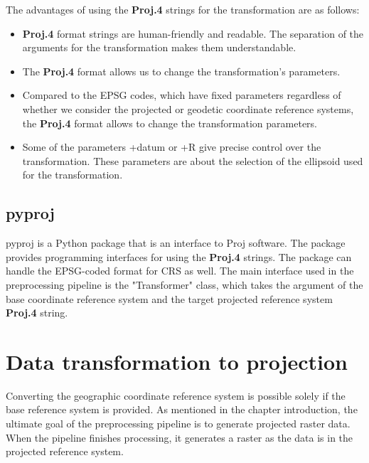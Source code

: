 The advantages of using the \textbf{Proj.4} strings for the transformation are as follows:
\begin{itemize}
    \item \textbf{Proj.4} format strings are human-friendly and readable. The separation of the arguments for the transformation makes them understandable.
    \item The \textbf{Proj.4} format allows us to change the transformation's parameters.
    \item Compared to the EPSG codes, which have fixed parameters regardless of whether we consider the projected or geodetic coordinate reference systems, the \textbf{Proj.4} format allows to change the transformation parameters.
    \item Some of the parameters +datum or +R give precise control over the transformation. These parameters are about the selection of the ellipsoid used for the transformation.
\end{itemize}

\subsection{pyproj}
\label{section:pyproj}
pyproj is a Python package that is an interface to Proj software. The package provides programming interfaces for using the \textbf{Proj.4} strings. The package can handle the EPSG-coded format for CRS as well. The main interface used in the preprocessing pipeline is the "Transformer" class, which takes the argument of the base coordinate reference system and the target projected reference system \textbf{Proj.4} string.

\section{Data transformation to projection}
Converting the geographic coordinate reference system is possible solely if the base reference system is provided.
As mentioned in the chapter introduction, the ultimate goal of the preprocessing pipeline is to generate projected raster data. When the pipeline finishes processing, it generates a raster as the data is in the projected reference system.

